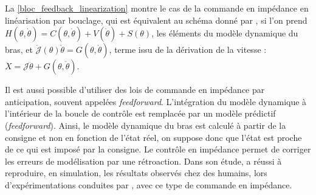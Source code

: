 \documentclass[12pt, a4paper]{article} %
\begin{document}
La \cref{bloc_feedback_linearization} montre le cas de la commande en impédance en linéarisation par bouclage, qui est équivalent au schéma donné par \cite{hogan_impedance_1985}, si l'on prend $H(\theta, \dot{\theta}) = C(\theta, \dot{\theta}) + V(\dot{\theta}) + S(\theta)$, les éléments du modèle dynamique du bras, et $\dot{\mathcal{J}}(\theta) \dot{\theta} = G(\theta,\dot{\theta})$, terme issu de la dérivation de la vitesse : $\ddot{X} = \mathcal{J}\ddot{\theta} + G(\theta,\dot{\theta})$.

\newlineBlank 

Il est aussi possible d'utiliser des lois de commande en impédance par anticipation, souvent appelées \textit{feedforward}. L'intégration du modèle dynamique à l'intérieur de la boucle de contrôle est remplacée par un modèle prédictif (\textit{feedforward}). Ainsi, le modèle dynamique du bras est calculé à partir de la consigne et non en fonction de l'état réel, on suppose donc que l'état est proche de ce qui est imposé par la consigne. Le contrôle en impédance permet de corriger les erreurs de modélisation par une rétroaction. Dans son étude, \cite{tee_model_2004} a réussi à reproduire, en simulation, les résultats observés chez des humains, lors d'expérimentations conduites par \cite{gomi_human_1997}, avec ce type de commande en impédance.

\newlineBlank 
\end{document}
